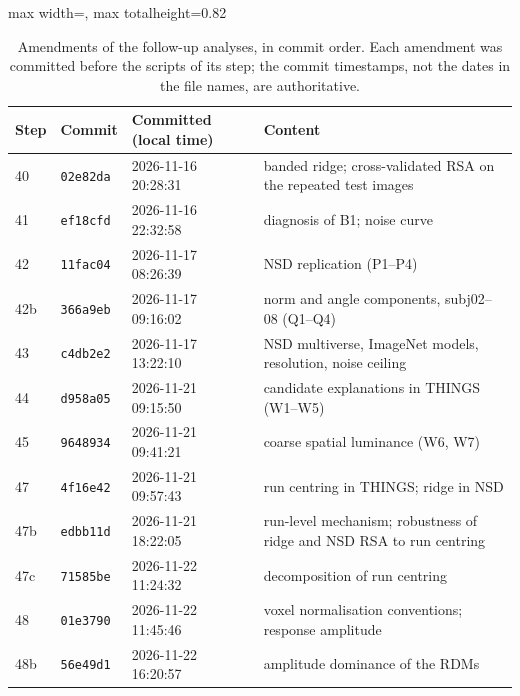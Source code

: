 \begin{table}[t]
\centering
\footnotesize
\begin{adjustbox}{max width=\textwidth, max totalheight=0.82\textheight}
\begin{tabular}{@{}llll@{}}
\toprule
Step & Commit & Committed (local time) & Content \\
\midrule
40 & \texttt{02e82da} & 2026-11-16 20:28:31 & banded ridge; cross-validated RSA on the repeated test images \\
41 & \texttt{ef18cfd} & 2026-11-16 22:32:58 & diagnosis of B1; noise curve \\
42 & \texttt{11fac04} & 2026-11-17 08:26:39 & NSD replication (P1--P4) \\
42b & \texttt{366a9eb} & 2026-11-17 09:16:02 & norm and angle components, subj02--08 (Q1--Q4) \\
43 & \texttt{c4db2e2} & 2026-11-17 13:22:10 & NSD multiverse, ImageNet models, resolution, noise ceiling \\
44 & \texttt{d958a05} & 2026-11-21 09:15:50 & candidate explanations in THINGS (W1--W5) \\
45 & \texttt{9648934} & 2026-11-21 09:41:21 & coarse spatial luminance (W6, W7) \\
47 & \texttt{4f16e42} & 2026-11-21 09:57:43 & run centring in THINGS; ridge in NSD \\
47b & \texttt{edbb11d} & 2026-11-21 18:22:05 & run-level mechanism; robustness of ridge and NSD RSA to run centring \\
47c & \texttt{71585be} & 2026-11-22 11:24:32 & decomposition of run centring \\
48 & \texttt{01e3790} & 2026-11-22 11:45:46 & voxel normalisation conventions; response amplitude \\
48b & \texttt{56e49d1} & 2026-11-22 16:20:57 & amplitude dominance of the RDMs \\
\bottomrule
\end{tabular}
\end{adjustbox}
\caption{Amendments of the follow-up analyses, in commit order. Each amendment was committed before the scripts of its step; the commit timestamps, not the dates in the file names, are authoritative.}
\label{tab:chronology}
\end{table}

